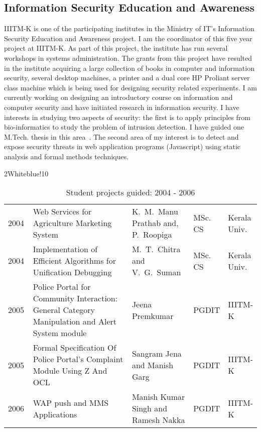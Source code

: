 \documentclass[titlepage, %
11pt, 
]{article}
\begin{document}
\subsection{Information Security Education and Awareness}
\label{subsec:isea}

IIITM-K is one of the participating institutes in the
Ministry of IT's Information Security Education and
Awareness project.  I am the coordinator of this five year
project at IIITM-K.  As part of this project, the institute
has run several workshops in systems administration.  The
grants from this project have resulted in the institute
acquiring a large collection of books in computer and
information security, several desktop machines, a printer
and a dual core HP Proliant server class machine which is
being used for designing security related experiments.  I am
currently working on designing an introductory course on
information and computer security and have initiated
research in information security.  I have interests in
studying two aspects of security: the first is to apply
principles from bio-informatics to study the problem of
intrusion detection.  I have guided one M.Tech. \@ thesis in
this area~\cite{pratap-2007}.  The second area of my
interest is to detect and expose security threats in web
application programs (Javascript) using static analysis and
formal methods techniques.

\begin{table}
\rowcolors%
{2}{White}{blue!10}
\setlength\extrarowheight{4pt}
\begin{tabular}%
{|p{0.10\linewidth}|p{0.45\linewidth}|p{0.25\linewidth}|p{0.10\linewidth}|p{0.10\linewidth}|}
\hline
\multicolumn{1}{|m{0.10\linewidth}|}{\centering {\bf Year}}&
\multicolumn{1}{m{0.45\linewidth}|}{\centering {\bf Project Title}}&
\multicolumn{1}{m{0.25\linewidth}|}{\centering {\bf Student}}&
\multicolumn{1}{m{0.10\linewidth}|}{\centering {\bf Degree}}&
\multicolumn{1}{m{0.10\linewidth}|}{\centering {\bf Univ.}}\\
\hline
2004 & Web Services for Agriculture Marketing System & K.~M.~Manu Prathab and, P.~Roopiga & MSc. CS & Kerala Univ.\\
2004 & Implementation of Efficient Algorithms for Unification Debugging &  M.~T.~Chitra  and V.~G.~Suman& MSc. CS & Kerala Univ.\\
2005 & Police Portal for Community Interaction: General Category
Manipulation and Alert System module & Jeena Premkumar  & PGDIT & IIITM-K\\
2005 & Formal Specification Of Police Portal's Complaint Module Using Z And OCL & Sangram Jena and Manish Garg & PGDIT & IIITM-K\\
2006 & WAP push and MMS Applications & Manish Kumar Singh and Ramesh Nakka  & PGDIT & IIITM-K\\
\hline
\end{tabular}
\caption{Student projects guided: 2004 - 2006 \label{tbl:ms-projects-1}}
\end{table}
\end{document}

